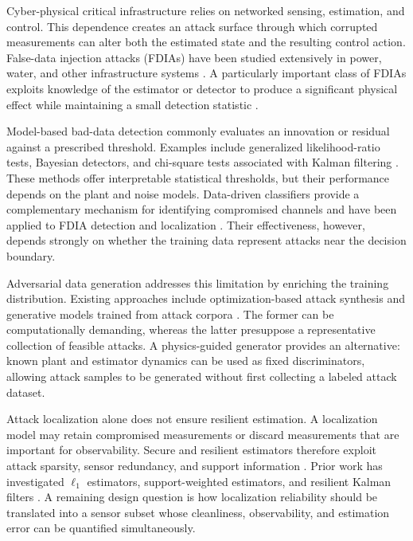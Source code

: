 Cyber-physical critical infrastructure relies on networked sensing, estimation, and control. This dependence creates an attack surface through which corrupted measurements can alter both the estimated state and the resulting control action. False-data injection attacks (FDIAs) have been studied extensively in power, water, and other infrastructure systems \cite{liu2011false,liang20162015,clark2017protecting,brentan2021cyber}. A particularly important class of FDIAs exploits knowledge of the estimator or detector to produce a significant physical effect while maintaining a small detection statistic \cite{mo2010false}.

Model-based bad-data detection commonly evaluates an innovation or residual against a prescribed threshold. Examples include generalized likelihood-ratio tests, Bayesian detectors, and chi-square tests associated with Kalman filtering \cite{tang2016detection,ding2018survey,mo2010false}. These methods offer interpretable statistical thresholds, but their performance depends on the plant and noise models. Data-driven classifiers provide a complementary mechanism for identifying compromised channels and have been applied to FDIA detection and localization \cite{ozay2016machine,boyaci2021joint,esmalifalak2011stealth}. Their effectiveness, however, depends strongly on whether the training data represent attacks near the decision boundary.

Adversarial data generation addresses this limitation by enriching the training distribution. Existing approaches include optimization-based attack synthesis and generative models trained from attack corpora \cite{yang2013false,mohammadpourfard2020generation,ahmadian2018cyber}. The former can be computationally demanding, whereas the latter presuppose a representative collection of feasible attacks. A physics-guided generator provides an alternative: known plant and estimator dynamics can be used as fixed discriminators, allowing attack samples to be generated without first collecting a labeled attack dataset.

Attack localization alone does not ensure resilient estimation. A localization model may retain compromised measurements or discard measurements that are important for observability. Secure and resilient estimators therefore exploit attack sparsity, sensor redundancy, and support information \cite{fawzi2014secure,pajic2014robustness,pajic2015attack,zheng2021Resilient}. Prior work has investigated $\ell_1$ estimators, support-weighted estimators, and resilient Kalman filters \cite{lee2015secure,zheng2020attack}. A remaining design question is how localization reliability should be translated into a sensor subset whose cleanliness, observability, and estimation error can be quantified simultaneously.

